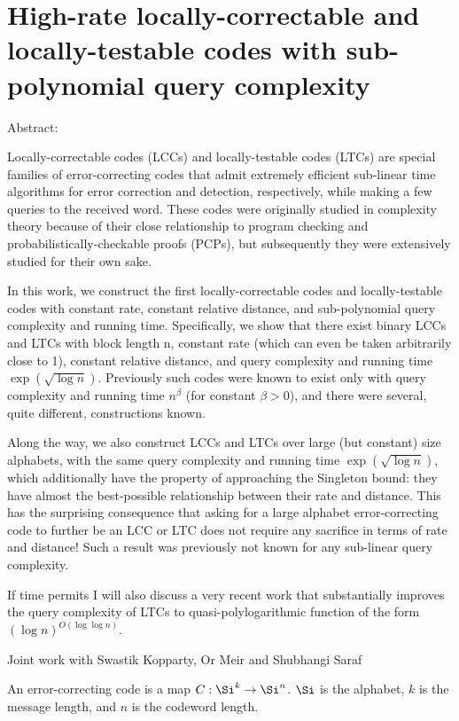 
\section{High-rate locally-correctable and locally-testable codes with
sub-polynomial query complexity}

Abstract:

Locally-correctable codes (LCCs) and locally-testable codes (LTCs) are
special families of error-correcting codes that admit extremely
efficient sub-linear time algorithms for error correction and
detection, respectively, while making a few queries to the received
word. These codes were originally studied in complexity theory because
of their close relationship to program checking and
probabilistically-checkable proofs (PCPs), but subsequently they were
extensively studied for their own sake.

In this work, we construct the first locally-correctable codes and
locally-testable codes with constant rate, constant relative distance,
and sub-polynomial query complexity and running time. Specifically, we
show that there exist binary LCCs and LTCs with block length n,
constant rate (which can even be taken arbitrarily close to 1),
constant relative distance, and query complexity and running time
$\exp(\sqrt{\log n})$. Previously such codes were known to exist only
with query complexity and running time $n^{\beta}$ (for constant $\beta
> 0$), and there were several, quite different, constructions known.

Along the way, we also construct LCCs and LTCs over large (but
constant) size alphabets, with the same query complexity and running
time $\exp(\sqrt{\log n})$, which additionally have the property of
approaching the Singleton bound: they have almost the best-possible
relationship between their rate and distance. This has the surprising
consequence that asking for a large alphabet error-correcting code to
further be an LCC or LTC does not require any sacrifice in terms of
rate and distance! Such a result was previously not known for any
sub-linear query complexity.

If time permits I will also discuss a very recent work that
substantially improves the query complexity of LTCs to
quasi-polylogarithmic function of the form $(\log n)^{O(\log \log n)}$.

Joint work with Swastik Kopparty, Or Meir and Shubhangi Saraf

An error-correcting code is a map $C:\Si^k\to \Si^n$. $\Si$ is the alphabet, $k$ is the message length, and $n$ is the codeword length.

